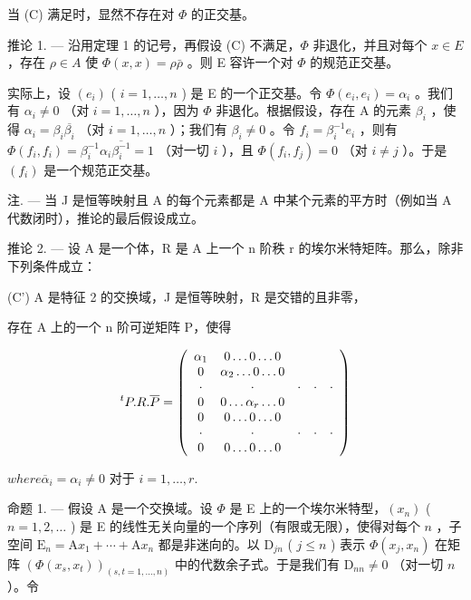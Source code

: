 当 (C) 满足时，显然不存在对 \(\Phi\) 的正交基。

推论 1. --- 沿用定理 1 的记号，再假设 (C) 不满足，\(\Phi\) 非退化，并且对每个 \(x \in E\) ，存在 \(\rho \in A\) 使 \(\Phi(x, x) = \rho \bar{\rho}\) 。则 E 容许一个对 \(\Phi\) 的规范正交基。

实际上，设 \((e_i)\) ( \(i = 1, \ldots, n\) ) 是 E 的一个正交基。令 \(\Phi(e_i, e_i) = \alpha_i\) 。我们有 \(\alpha_i \neq 0\) （对 \(i = 1, \ldots, n\) ），因为 \(\Phi\) 非退化。根据假设，存在 A 的元素 \(\beta_i\) ，使得 \(\alpha_i = \beta_i \overline{\beta_i}\) （对 \(i = 1, \ldots, n\) ）；我们有 \(\beta_i \neq 0\) 。令 \(f_i = \beta_i^{-1} e_i\) ，则有 \(\Phi(f_i, f_i) = \beta_i^{-1} \alpha_i \overline{\beta_i^{-1}} = 1\) （对一切 \(i\) ），且 \(\Phi(f_i, f_j) = 0\) （对 \(i \neq j\) ）。于是 \((f_i)\) 是一个规范正交基。

注. --- 当 J 是恒等映射且 A 的每个元素都是 A 中某个元素的平方时（例如当 A 代数闭时），推论的最后假设成立。

推论 2. --- 设 A 是一个体，R 是 A 上一个 n 阶秩 r 的埃尔米特矩阵。那么，除非下列条件成立：

(C') A 是特征 2 的交换域，J 是恒等映射，R 是交错的且非零，

存在 A 上的一个 n 阶可逆矩阵 P，使得

\[
{ } ^ { t } P . R . \overline { { P } } = \left( \begin{array} { c c c c c } \alpha _ { 1 } & 0 \dots 0 \dots 0 \\ 0 & \alpha _ { 2 } \dots 0 \dots 0 \\ \cdot & \cdot & \cdot & \cdot & \cdot \\ 0 & 0 \dots \alpha _ { r } \dots 0 \\ 0 & 0 \dots 0 \dots 0 \\ \cdot & \cdot & \cdot & \cdot & \cdot \\ 0 & 0 \dots 0 \dots 0 \end{array} \right)
\]

\(where \overline{\alpha}_{i} = \alpha_{i} \neq 0 \text{ 对于 } i = 1, \ldots, r.\)

命题 1. --- 假设 A 是一个交换域。设 \(\Phi\) 是 E 上的一个埃尔米特型，\((x_{n})\) ( \(n=1,2,\ldots\) ) 是 E 的线性无关向量的一个序列（有限或无限），使得对每个 \(n\) ，子空间 \(\mathrm{E}_{n}=\mathrm{A}x_{1}+\cdots+\mathrm{A}x_{n}\) 都是非迷向的。以 \(\mathrm{D}_{jn}\) ( \(j\leqslant n\) ) 表示 \(\Phi(x_{j},x_{n})\) 在矩阵 \((\Phi(x_{s},x_{t}))_{(s,t=1,\ldots,n)}\) 中的代数余子式。于是我们有 \(\mathrm{D}_{nn}\neq0\) （对一切 \(n\) ）。令


